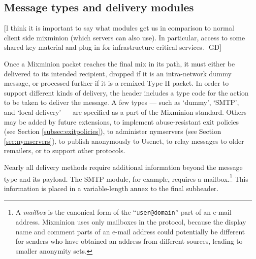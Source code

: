 \documentclass[11pt]{IEEEtran}
\begin{document}
\subsection{Message types and delivery modules}
\label{subsec:delivery-modules}

[I think it is important to say what modules get us in comparison to
normal client side mixminion (which servers can also use). In
particular, access to some shared key material and plug-in for
infrastructure critical services. -GD]

Once a Mixminion packet reaches the final mix in its path, it must
either be delivered to its intended recipient, dropped if it is an
intra-network dummy message, or processed further if it is a remixed
Type II packet. In order to support different kinds of
delivery, the header includes a type code for the action to be taken
to deliver the message.  A few types --- such as `dummy', `SMTP', and
`local delivery' --- are specified as a part of the Mixminion
standard.  Others may be added by future extensions, to
implement abuse-resistant exit policies (see Section
\ref{subsec:exitpolicies}), to administer nymservers (see Section
\ref{sec:nymservers}), to publish anonymously to Usenet, to relay
messages to older remailers, or to support other protocols.

Nearly all delivery methods require additional information beyond the
message type and its payload.  The SMTP module, for example, requires
a mailbox.\footnote{A {\it mailbox} is the canonical form of the
``{\tt user@domain}'' part of an e-mail address. Mixminion uses only
mailboxes in the protocol, because the display name and comment parts
of an e-mail address could potentially be different for senders who
have obtained an address from different sources, leading to smaller
anonymity sets.}
This information is placed
in a variable-length annex to the final subheader.
\end{document}
